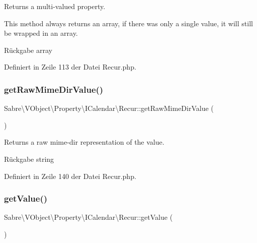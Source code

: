 Returns a multi-\/valued property.

This method always returns an array, if there was only a single value, it will still be wrapped in an array.

\begin{DoxyReturn}{Rückgabe}
array 
\end{DoxyReturn}


Definiert in Zeile 113 der Datei Recur.\+php.

\mbox{\label{class_sabre_1_1_v_object_1_1_property_1_1_i_calendar_1_1_recur_ae33183f73b95322092e4684defb4a2bf}} 
\subsubsection{\texorpdfstring{get\+Raw\+Mime\+Dir\+Value()}{getRawMimeDirValue()}}
{\footnotesize\ttfamily Sabre\textbackslash{}\+V\+Object\textbackslash{}\+Property\textbackslash{}\+I\+Calendar\textbackslash{}\+Recur\+::get\+Raw\+Mime\+Dir\+Value (\begin{DoxyParamCaption}{ }\end{DoxyParamCaption})}

Returns a raw mime-\/dir representation of the value.

\begin{DoxyReturn}{Rückgabe}
string 
\end{DoxyReturn}


Definiert in Zeile 140 der Datei Recur.\+php.

\mbox{\label{class_sabre_1_1_v_object_1_1_property_1_1_i_calendar_1_1_recur_a4d3130e86da49d213e75ea33d1571005}} 
\subsubsection{\texorpdfstring{get\+Value()}{getValue()}}
{\footnotesize\ttfamily Sabre\textbackslash{}\+V\+Object\textbackslash{}\+Property\textbackslash{}\+I\+Calendar\textbackslash{}\+Recur\+::get\+Value (\begin{DoxyParamCaption}{ }\end{DoxyParamCaption})}

